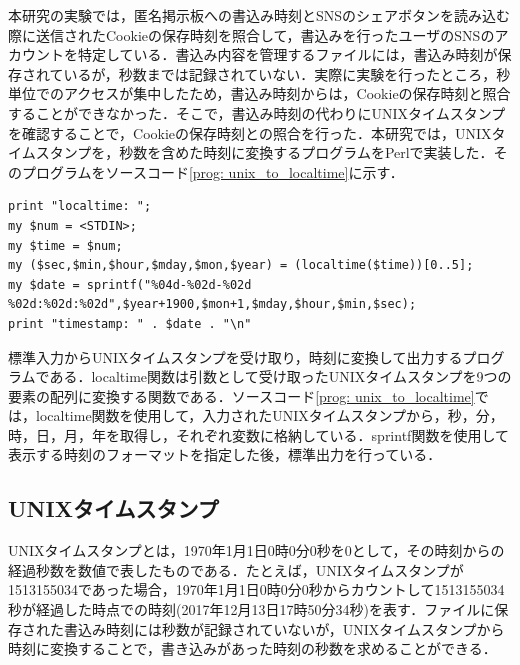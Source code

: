 \documentclass[10pt, a4paper]{jreport}
\begin{document}
本研究の実験では，匿名掲示板への書込み時刻とSNSのシェアボタンを読み込む際に送信されたCookieの保存時刻を照合して，書込みを行ったユーザのSNSのアカウントを特定している．書込み内容を管理するファイルには，書込み時刻が保存されているが，秒数までは記録されていない．実際に実験を行ったところ，秒単位でのアクセスが集中したため，書込み時刻からは，Cookieの保存時刻と照合することができなかった．そこで，書込み時刻の代わりにUNIXタイムスタンプを確認することで，Cookieの保存時刻との照合を行った．本研究では，UNIXタイムスタンプを，秒数を含めた時刻に変換するプログラムをPerlで実装した．そのプログラムをソースコード\ref{prog: unix_to_localtime}に示す．

\begin{lstlisting}[caption=UNIXタイムスタンプ変換プログラム,label=prog: unix_to_localtime]
print "localtime: ";
my $num = <STDIN>;
my $time = $num;
my ($sec,$min,$hour,$mday,$mon,$year) = (localtime($time))[0..5];
my $date = sprintf("%04d-%02d-%02d %02d:%02d:%02d",$year+1900,$mon+1,$mday,$hour,$min,$sec);
print "timestamp: " . $date . "\n"
\end{lstlisting}

標準入力からUNIXタイムスタンプを受け取り，時刻に変換して出力するプログラムである．localtime関数は引数として受け取ったUNIXタイムスタンプを9つの要素の配列に変換する関数である\cite{localtime}．ソースコード\ref{prog: unix_to_localtime}では，localtime関数を使用して，入力されたUNIXタイムスタンプから，秒，分，時，日，月，年を取得し，それぞれ変数に格納している．sprintf関数を使用して表示する時刻のフォーマットを指定した後，標準出力を行っている．

\subsection*{UNIXタイムスタンプ}
UNIXタイムスタンプとは，1970年1月1日0時0分0秒を0として，その時刻からの経過秒数を数値で表したものである．たとえば，UNIXタイムスタンプが1513155034であった場合，1970年1月1日0時0分0秒からカウントして1513155034秒が経過した時点での時刻(2017年12月13日17時50分34秒)を表す．ファイルに保存された書込み時刻には秒数が記録されていないが，UNIXタイムスタンプから時刻に変換することで，書き込みがあった時刻の秒数を求めることができる．
\end{document}
